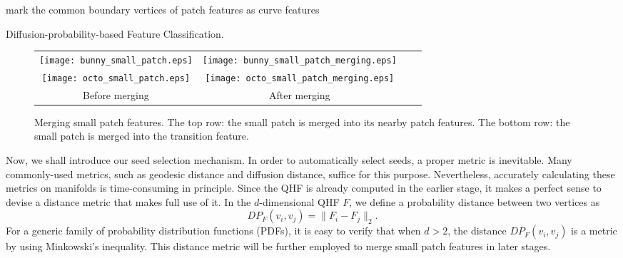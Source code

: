 \documentclass[10pt,journal,cspaper,compsoc]{IEEEtran}
\begin{document}
\begin{algorithm}[t]
\SetLine
{}
{mark the common boundary vertices of patch features as curve features\;}
\caption{Diffusion-probability-based Feature Classification.}
\label{classification}
\end{algorithm}

\begin{figure}[t]
\begin{center}
\begin{tabular}{@{}c@{} @{}c@{} @{}c@{} @{}c@{}}
\texttt{[image: bunny\_small\_patch.eps]} &
\texttt{[image: bunny\_small\_patch\_merging.eps]} \\
\texttt{[image: octo\_small\_patch.eps]} &
\texttt{[image: octo\_small\_patch\_merging.eps]} \\
Before merging           & After merging\\
\end{tabular}
\caption{Merging small patch features.
The top row: the small patch is merged into its nearby patch
features. The bottom row: the small patch is merged into the
transition feature.}
\label{fig:merge}
\end{center}
\end{figure}

Now, we shall introduce our seed selection mechanism. In order to
automatically select seeds, a proper metric is inevitable. Many
commonly-used metrics, such as geodesic distance and diffusion
distance, suffice for this purpose. Nevertheless, accurately
calculating these metrics on manifolds is time-consuming in
principle. Since the QHF is already computed in the earlier stage, it
makes a perfect sense to devise a distance metric that makes full use
of it. In the $d$-dimensional QHF $F$, we define a probability
distance between two vertices as
\begin{equation}
\label{eq:distance}
DP_F(v_i,v_j)= \| F_{i}-F_{j}\|_2.
\end{equation}
For a generic family of probability distribution functions (PDFs), it
is easy to verify that when $d>2$, the distance $DP_F(v_i,v_j)$ is a
metric by using Minkowski's inequality. This distance metric will be
further employed to merge small patch features in later stages.
\end{document}
